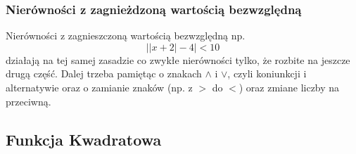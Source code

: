 \documentclass[12pt, a4paper]{article}
\begin{document}
\subsubsection{Nierówności z zagnieżdzoną wartością bezwzględną}
Nierówności z zagnieszczoną wartością bezwzględną np. $$\left|\left|x+2\right|-4\right|<10$$ działają na tej samej zasadzie co
zwykłe nierówności tylko, że rozbite na jeszcze drugą część. Dalej trzeba pamiętąc o znakach $\wedge$ i $\vee$, czyli koniunkcji i alternatywie
oraz o zamianie znaków (np. z $>$ do $<$) oraz zmiane liczby na przeciwną.


\subsection{Funkcja Kwadratowa}
\end{document}
